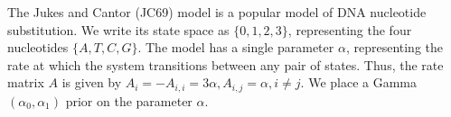   The Jukes and Cantor (JC69) model is a popular model of DNA nucleotide
  substitution.  We write its state space as $\{0, 1, 2, 3\}$, representing the 
  four nucleotides $\{A, T, C, G\}$.  The model has a single parameter $\alpha$, 
  representing the rate at which the system transitions between any pair of 
  states. Thus, the rate matrix $A$ is given by 
$A_i = -A_{i,i} = 3\alpha, A_{i, j} = \alpha,i \neq j.$
We place a Gamma$(\alpha_0,\alpha_1)$ prior on the parameter $\alpha$.

